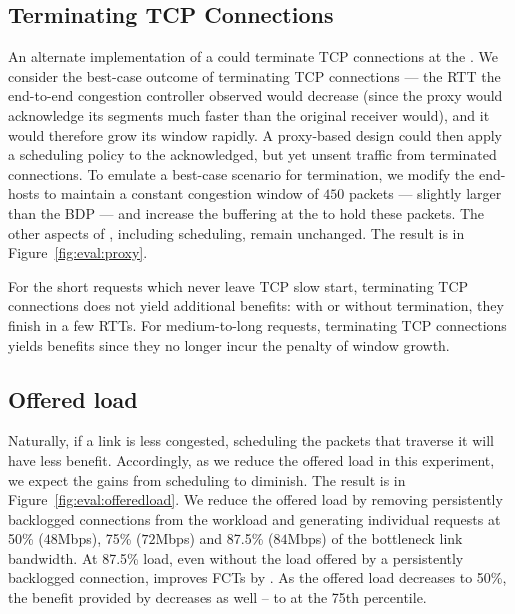 \subsection{Terminating TCP Connections}\label{s:eval:proxy}
An alternate implementation of a \name could terminate TCP connections at the \inbox. 
We consider the best-case outcome of terminating TCP connections --- the RTT the end-to-end congestion controller observed would decrease (since the proxy would acknowledge its segments much faster than the original receiver would), and it would therefore grow its window rapidly.
A proxy-based design could then apply a scheduling policy to the acknowledged, but yet unsent traffic from terminated connections.
To emulate a best-case scenario for termination, we modify the end-hosts to maintain a constant congestion window of $450$ packets --- slightly larger than the BDP --- and increase the buffering at the \inbox to hold these packets. 
The other aspects of \name, including scheduling, remain unchanged.
The result is in Figure~\ref{fig:eval:proxy}.
%

%
For the short requests which never leave TCP slow start, terminating TCP connections does not yield additional benefits: with or without termination, they finish in a few RTTs.
For medium-to-long requests, terminating TCP connections yields benefits since they no longer incur the penalty of window growth.



\subsection{Offered load}\label{s:eval:offeredload}
Naturally, if a link is less congested, scheduling the packets that traverse it will have less benefit. Accordingly, as we reduce the offered load in this experiment, we expect the gains from scheduling to diminish. The result is in Figure~\ref{fig:eval:offeredload}. We reduce the offered load by removing persistently backlogged connections from the workload and generating individual requests at 50\% ($48$Mbps), 75\% ($72$Mbps) and 87.5\% ($84$Mbps) of the bottleneck link bandwidth.
At 87.5\% load, even without the load offered by a persistently backlogged connection, \name improves FCTs by . 
As the offered load decreases to 50\%, the benefit provided by \name decreases as well -- to  at the 75th percentile.


